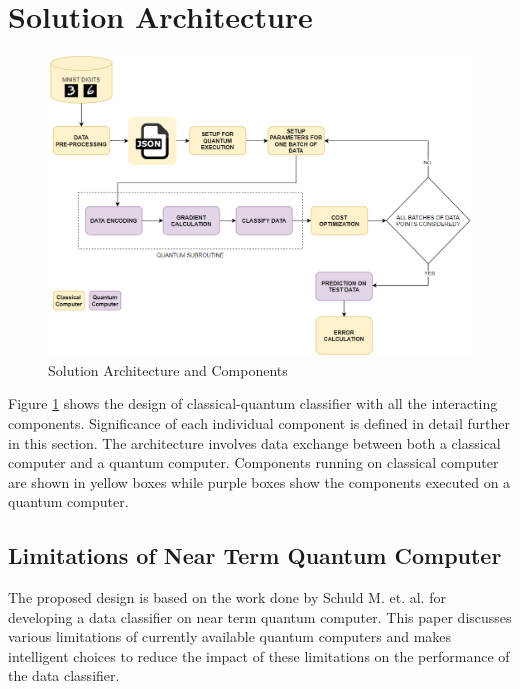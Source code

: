 \documentclass[english,a4paper,11pt,oneside,onecolumn]{book}
\begin{document}
\section{Solution Architecture}
\label{sec:solArch}

\begin{figure}[H]
    \centering
    \includegraphics[scale=0.75]{Images/Architecture.png}
    \caption{Solution Architecture and Components}
    \label{fig:solArchComp}
\end{figure}

Figure \ref{fig:solArchComp} shows the design of classical-quantum classifier with all the interacting components. Significance of each individual component is defined in detail further in this section. The architecture involves data exchange between both a classical computer and a quantum computer. Components running on classical computer are shown in yellow boxes while purple boxes show the components executed on a quantum computer.

\subsection{Limitations of Near Term Quantum Computer}
The proposed design is based on the work done by Schuld M. et. al. \cite{schuld_2020_circuitcentric} for developing a data classifier on near term quantum computer. This paper discusses various limitations of currently available quantum computers \cite{perdomoortiz_2018_opportunities} and makes intelligent choices to reduce the impact of these limitations on the performance of the data classifier.
\end{document}
